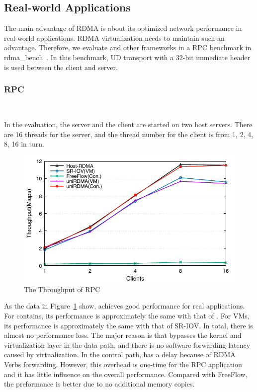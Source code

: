 \subsection{Real-world Applications}

The main advantage of RDMA is about its optimized network performance in real-world applications. RDMA virtualization needs to maintain such an advantage. Therefore, we evaluate \sys and other frameworks in a RPC benchmark in rdma\_bench~\cite{rbench}. In this benchmark, UD transport with a 32-bit immediate header is used between the client and server.

\subsubsection{\textbf{RPC}}
\
\noindent



In the evaluation, the server and the client are started on two host servers. There are 16 threads for the server, and the thread number for the client is from 1, 2, 4, 8, 16 in turn. %

\begin{figure}[!ht]
	\centering
	\includegraphics[width=1.0\linewidth]{images/rpc.pdf}
	\caption{The Throughput of RPC}
	\label{fig:rpc}
\end{figure}

As the data in Figure~\ref{fig:rpc} show, \sys achieves good performance for real applications. For contains, its performance is approximately the same with that of \native. For VMs, its performance is approximately the same with that of SR-IOV. In total, there is almost no performance loss. The major reason is that \sys bypasses the kernel and virtualization layer in the data path, and there is no software forwarding latency caused by virtualization. In the control path, \sys has a delay because of RDMA Verbs forwarding. However, this overhead is one-time for the RPC application and it has little influence on the overall performance. Compared with FreeFlow, the preformance \sys is better due to no additional memory copies. 



